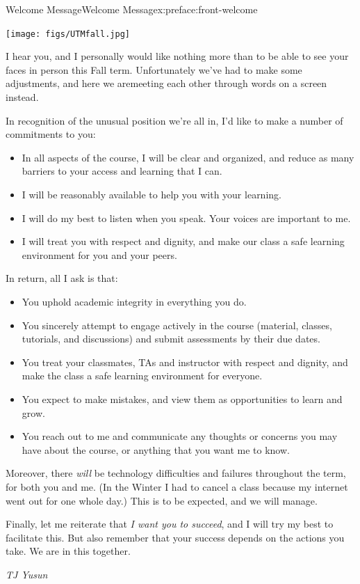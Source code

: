 \documentclass[oneside,10pt,]{book}
\numberwithin{equation}{section}
\begin{document}
\begin{preface}{Welcome Message}{}{Welcome Message}{}{}{x:preface:front-welcome}
\begin{sidebyside}{1}{0.15}{0.15}{0}%
\begin{sbspanel}{0.7}%
\texttt{[image: figs/UTMfall.jpg]}
\end{sbspanel}%
\end{sidebyside}%
\par
I hear you, and I personally would like nothing more than to be able to see your faces in person this Fall term. Unfortunately we've had to make some adjustments, and here we are\textemdash{}meeting each other through words on a screen instead.%
\par
In recognition of the unusual position we're all in, I'd like to make a number of commitments to you:%
\begin{itemize}[label=\textbullet]
\item{}In all aspects of the course, I will be clear and organized, and reduce as many barriers to your access and learning that I can.%
\item{}I will be reasonably available to help you with your learning.%
\item{}I will do my best to listen when you speak. Your voices are important to me.%
\item{}I will treat you with respect and dignity, and make our class a safe learning environment for you and your peers.%
\end{itemize}
In return, all I ask is that:%
\begin{itemize}[label=\textbullet]
\item{}You uphold academic integrity in everything you do.%
\item{}You sincerely attempt to engage actively in the course (material, classes, tutorials, and discussions) and submit assessments by their due dates.%
\item{}You treat your classmates, TAs and instructor with respect and dignity, and make the class a safe learning environment for everyone.%
\item{}You expect to make mistakes, and view them as opportunities to learn and grow.%
\item{}You reach out to me and communicate any thoughts or concerns you may have about the course, or anything that you want me to know.%
\end{itemize}
%
\par
Moreover, there \emph{will} be technology difficulties and failures throughout the term, for both you and me. (In the Winter I had to cancel a class because my internet went out for one whole day.) This is to be expected, and we will manage.%
\par
Finally, let me reiterate that \emph{I want you to succeed}, and I will try my best to facilitate this. But also remember that your success depends on the actions you take. We are in this together.%
\par
\emph{TJ Yusun}%
\end{preface}
\end{document}
